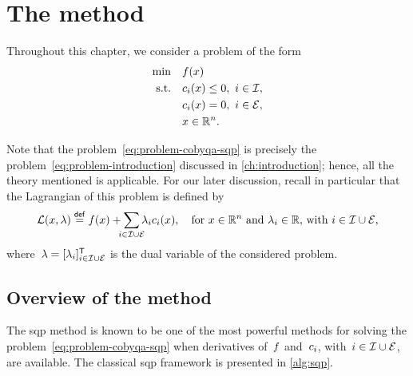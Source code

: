 \section{The method}
\label{sec:sqp-method}

Throughout this chapter, we consider a problem of the form
\begin{subequations}
    \label{eq:problem-cobyqa-sqp}
    \begin{align}
        \min        & \quad \obj(\iter) \label{eq:problem-cobyqa-sqp-obj}\\
        \text{s.t.} & \quad \con{i}(\iter) \le 0, ~ i \in \iub, \label{eq:problem-cobyqa-sqp-ub}\\
                    & \quad \con{i}(\iter) = 0, ~ i \in \ieq, \label{eq:problem-cobyqa-sqp-eq}\\
                    & \quad \iter \in \R^n. \nonumber
    \end{align}
\end{subequations}

Note that the problem~\cref{eq:problem-cobyqa-sqp} is precisely the problem~\cref{eq:problem-introduction} discussed in \cref{ch:introduction}; hence, all the theory mentioned is applicable.
For our later discussion, recall in particular that the Lagrangian of this problem is defined by
\begin{equation*}
    \lag(\iter, \lm) \eqdef \obj(\iter) + \sum_{\mathclap{i \in \iub \cup \ieq}} \lm_i \con{i}(\iter), \quad \text{for~$\iter \in \R^n$ and~$\lm_i \in \R$, with~$i \in \iub \cup \ieq$,}
\end{equation*}
where~$\lm = [\lm_i]_{i \in \iub \cup \ieq}^{\T}$ is the dual variable of the considered problem.

\subsection{Overview of the method}

The \gls{sqp} method is known to be one of the most powerful methods for solving the problem~\cref{eq:problem-cobyqa-sqp} when derivatives of~$f$ and~$c_{i}$, with~$i \in \mathcal{I} \cup \mathcal{E}$, are available.
The classical \gls{sqp} framework is presented in \cref{alg:sqp}.

